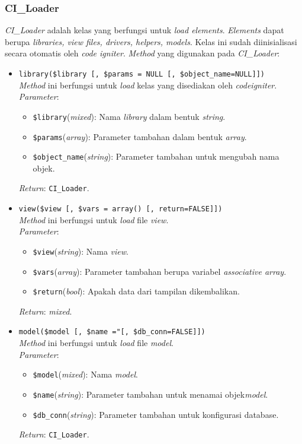 \subsubsection{CI\_Loader}
\textit{CI\_Loader} adalah kelas yang berfungsi untuk \textit{load elements}. \textit{Elements} dapat berupa \textit{libraries, view files, drivers, helpers, models}. Kelas ini sudah diinisialisasi secara otomatis oleh \textit{code igniter}. \textit{Method} yang digunakan pada \textit{CI\_Loader}:

\begin{itemize}
	\item \texttt{library(\$library [, \$params = NULL [, \$object\_name=NULL]])} \\
	\textit{Method} ini berfungsi untuk \textit{load} kelas yang disediakan oleh \textit{codeigniter}. \\
	\textit{Parameter}: 
	\begin{itemize}
		\item \texttt{\$library}(\textit{mixed}): Nama \textit{library} dalam bentuk \textit{string}.
		\item \texttt{\$params}(\textit{array}): Parameter tambahan dalam bentuk \textit{array}.
		\item \texttt{\$object\_name}(\textit{string}): Parameter tambahan untuk mengubah nama objek.
	\end{itemize}
	\textit{Return}: \texttt{CI\_Loader}.
	\item \texttt{view(\$view [, \$vars = array() [, return=FALSE]])} \\
	\textit{Method} ini berfungsi untuk \textit{load} file \textit{view}. \\
	\textit{Parameter}:
	\begin{itemize}
		\item \texttt{\$view}(\textit{string}): Nama \textit{view}.
		\item \texttt{\$vars}(\textit{array}): Parameter tambahan berupa variabel \textit{associative array}.
		\item \texttt{\$return}(\textit{bool}): Apakah data dari tampilan dikembalikan.
	\end{itemize}
	\textit{Return}: \textit{mixed}.
	
	\item \texttt{model(\$model [, \$name ="[, \$db\_conn=FALSE]])} \\
	\textit{Method} ini berfungsi untuk \textit{load} file \textit{model}. \\
	\textit{Parameter}:
	\begin{itemize}
		\item \texttt{\$model}(\textit{mixed}): Nama \textit{model}.
		\item \texttt{\$name}(\textit{string}): Parameter tambahan untuk menamai objek\textit{model}.
		\item \texttt{\$db\_conn}(\textit{string}): Parameter tambahan untuk konfigurasi database.
	\end{itemize}
	\textit{Return}: \texttt{CI\_Loader}.
	

\end{itemize}
